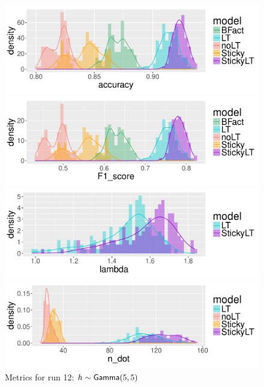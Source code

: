 \begin{figure}[tb]
  \centering
  \begin{minipage}{0.75\textwidth}
  \includegraphics[width = \textwidth]{fig/cocktail/synth_s16_m12/hyper_h/h10.0_nocs_cp0/a5b5/accuracy_density.pdf}
\end{minipage}

\begin{minipage}{0.75\textwidth}
  \includegraphics[width = \textwidth]{fig/cocktail/synth_s16_m12/hyper_h/h10.0_nocs_cp0/a5b5/F1_score_density.pdf}
\end{minipage}

\begin{minipage}{0.75\textwidth}
  \includegraphics[width = \textwidth]{fig/cocktail/synth_s16_m12/hyper_h/h10.0_nocs_cp0/a5b5/lambda_density.pdf}
\end{minipage}

\begin{minipage}{0.75\textwidth}
  \includegraphics[width = \textwidth]{fig/cocktail/synth_s16_m12/hyper_h/h10.0_nocs_cp0/a5b5/n_dot_density.pdf}
\end{minipage}
\caption{Metrics for run 12: $h \sim \mathsf{Gamma}(5,5)$}
\end{figure}

